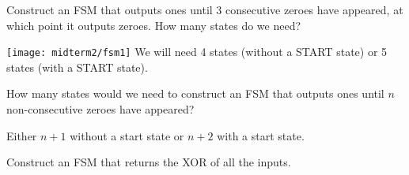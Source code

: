 \begin{blocksection}
\question
Construct an FSM that outputs ones until 3 consecutive zeroes have appeared, at which point it outputs zeroes. How many states do we need?

\begin{solution}[1.5in]
\texttt{[image: midterm2/fsm1]}
We will need 4 states (without a START state) or 5 states (with a START state).
\end{solution}

\question
How many states would we need to construct an FSM that outputs ones until $n$ non-consecutive zeroes have appeared?

\begin{solution}[0.7in]
Either $n + 1$ without a start state or $n + 2$ with a start state.
\end{solution}

\question
Construct an FSM that returns the XOR of all the inputs.

\begin{solution}[0.7in]
\end{solution}

\end{blocksection}